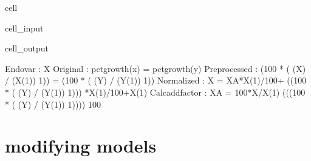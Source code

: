 \documentclass[letterpaper,10pt,english]{jupyterBook}
\begin{document}
\begin{sphinxuseclass}{cell}\begin{sphinxVerbatimInput}

\begin{sphinxuseclass}{cell_input}
\begin{sphinxVerbatim}[commandchars=\\\{\}]
\end{sphinxVerbatim}

\end{sphinxuseclass}\end{sphinxVerbatimInput}
\begin{sphinxVerbatimOutput}

\begin{sphinxuseclass}{cell_output}
\begin{sphinxVerbatim}[commandchars=\\\{\}]
Endo\PYGZus{}var        : X
Original        : pct\PYGZus{}growth(x)  = pct\PYGZus{}growth(y) 
Preprocessed    :  (100 * ( (X) / (X(\PYGZhy{}1)) \PYGZhy{}1)) = (100 * ( (Y) / (Y(\PYGZhy{}1)) \PYGZhy{}1)) 
Normalized      : X = X\PYGZus{}A*X(\PYGZhy{}1)/100+ ((100 * ( (Y) / (Y(\PYGZhy{}1)) \PYGZhy{}1))) *X(\PYGZhy{}1)/100+X(\PYGZhy{}1)
Calc\PYGZus{}add\PYGZus{}factor : X\PYGZus{}A = 100*X/X(\PYGZhy{}1)\PYGZhy{} (((100 * ( (Y) / (Y(\PYGZhy{}1)) \PYGZhy{}1)))) \PYGZhy{}100
\end{sphinxVerbatim}

\begin{sphinxVerbatim}[commandchars=\\\{\}]

\end{sphinxVerbatim}

\end{sphinxuseclass}\end{sphinxVerbatimOutput}

\end{sphinxuseclass}
\sphinxstepscope


\part{modifying models}

\sphinxstepscope
\end{document}
